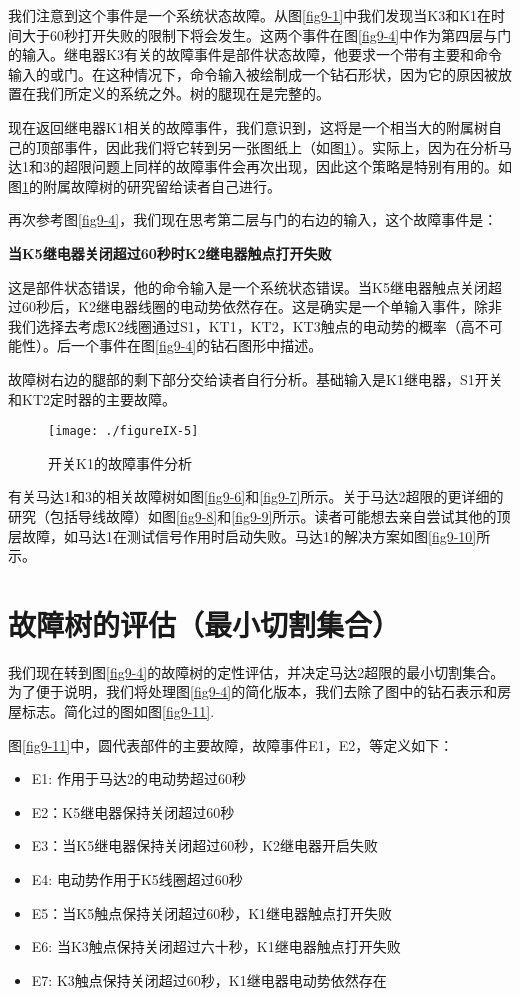 \documentclass[cn,11pt,chinese]{elegantbook}
\begin{document}
{我们注意到这个事件是一个系统状态故障。从图\ref{fig9-1}中我们发现当K3和K1在时间大于60秒打开失败的限制下将会发生。这两个事件在图\ref{fig9-4}中作为第四层与门的输入。继电器K3有关的故障事件是部件状态故障，他要求一个带有主要和命令输入的或门。在这种情况下，命令输入被绘制成一个钻石形状，因为它的原因被放置在我们所定义的系统之外。树的腿现在是完整的。

现在返回继电器K1相关的故障事件，我们意识到，这将是一个相当大的附属树自己的顶部事件，因此我们将它转到另一张图纸上（如图\ref{fig9-5}）。实际上，因为在分析马达1和3的超限问题上同样的故障事件会再次出现，因此这个策略是特别有用的。如图\ref{fig9-5}的附属故障树的研究留给读者自己进行。

再次参考图\ref{fig9-4}，我们现在思考第二层与门的右边的输入，这个故障事件是：

\textbf{当K5继电器关闭超过60秒时K2继电器触点打开失败
}

这是部件状态错误，他的命令输入是一个系统状态错误。当K5继电器触点关闭超过60秒后，K2继电器线圈的电动势依然存在。这是确实是一个单输入事件，除非我们选择去考虑K2线圈通过S1，KT1，KT2，KT3触点的电动势的概率（高不可能性）。后一个事件在图\ref{fig9-4}的钻石图形中描述。

故障树右边的腿部的剩下部分交给读者自行分析。基础输入是K1继电器，S1开关和KT2定时器的主要故障。
\begin{figure}
	\texttt{[image: ./figureIX-5]}
	\caption{开关K1的故障事件分析}
	\label{fig9-5}
\end{figure}
有关马达1和3的相关故障树如图\ref{fig9-6}和\ref{fig9-7}所示。关于马达2超限的更详细的研究（包括导线故障）如图\ref{fig9-8}和\ref{fig9-9}所示。读者可能想去亲自尝试其他的顶层故障，如马达1在测试信号作用时启动失败。马达1的解决方案如图\ref{fig9-10}所示。

\section{故障树的评估（最小切割集合）}

我们现在转到图\ref{fig9-4}的故障树的定性评估，并决定马达2超限的最小切割集合。为了便于说明，我们将处理图\ref{fig9-4}的简化版本，我们去除了图中的钻石表示和房屋标志。简化过的图如图\ref{fig9-11}.

图\ref{fig9-11}中，圆代表部件的主要故障，故障事件E1，E2，等定义如下：


\begin{itemize}
\item E1: 作用于马达2的电动势超过60秒
\item E2：K5继电器保持关闭超过60秒
\item E3：当K5继电器保持关闭超过60秒，K2继电器开启失败
\item E4: 电动势作用于K5线圈超过60秒
\item E5：当K5触点保持关闭超过60秒，K1继电器触点打开失败
\item E6: 当K3触点保持关闭超过六十秒，K1继电器触点打开失败
\item E7: K3触点保持关闭超过60秒，K1继电器电动势依然存在
\end{itemize}

}
\end{document}
